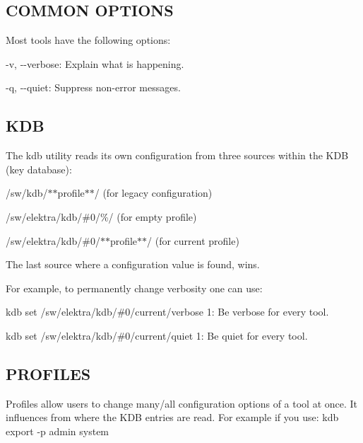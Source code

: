 \subsection*{C\+O\+M\+M\+ON O\+P\+T\+I\+O\+NS}

Most tools have the following options\+:


\begin{DoxyItemize}
\item {\ttfamily -\/v}, {\ttfamily -\/-\/verbose}\+: Explain what is happening.
\item {\ttfamily -\/q}, {\ttfamily -\/-\/quiet}\+: Suppress non-\/error messages.
\end{DoxyItemize}

\subsection*{K\+DB}

The {\ttfamily kdb} utility reads its own configuration from three sources within the K\+DB (key database)\+:


\begin{DoxyEnumerate}
\item /sw/kdb/$\ast$$\ast$profile$\ast$$\ast$/ (for legacy configuration)
\item /sw/elektra/kdb/\#0/\%/ (for empty profile)
\item /sw/elektra/kdb/\#0/$\ast$$\ast$profile$\ast$$\ast$/ (for current profile)
\end{DoxyEnumerate}

The last source where a configuration value is found, wins.

For example, to permanently change verbosity one can use\+:


\begin{DoxyItemize}
\item {\ttfamily kdb set /sw/elektra/kdb/\#0/current/verbose 1}\+: Be verbose for every tool.
\item {\ttfamily kdb set /sw/elektra/kdb/\#0/current/quiet 1}\+: Be quiet for every tool.
\end{DoxyItemize}

\subsection*{P\+R\+O\+F\+I\+L\+ES}

Profiles allow users to change many/all configuration options of a tool at once. It influences from where the K\+DB entries are read. For example if you use\+: {\ttfamily kdb export -\/p admin system}

